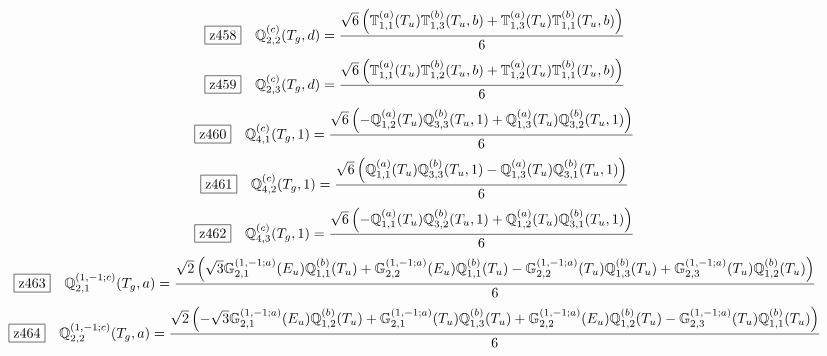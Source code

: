 \documentclass[fleqn,10pt,landscape]{jsarticle}
\begin{document}
\begin{dmath*}
\hspace*{3mm}\fbox{z458}\quad \mathbb{Q}_{2,2}^{(c)}(T_{g},d)=\frac{\sqrt{6} \left(\mathbb{T}_{1,1}^{(a)}(T_{u}) \mathbb{T}_{1,3}^{(b)}(T_{u},b) + \mathbb{T}_{1,3}^{(a)}(T_{u}) \mathbb{T}_{1,1}^{(b)}(T_{u},b)\right)}{6}
\end{dmath*}
\begin{dmath*}
\hspace*{3mm}\fbox{z459}\quad \mathbb{Q}_{2,3}^{(c)}(T_{g},d)=\frac{\sqrt{6} \left(\mathbb{T}_{1,1}^{(a)}(T_{u}) \mathbb{T}_{1,2}^{(b)}(T_{u},b) + \mathbb{T}_{1,2}^{(a)}(T_{u}) \mathbb{T}_{1,1}^{(b)}(T_{u},b)\right)}{6}
\end{dmath*}
\begin{dmath*}
\hspace*{3mm}\fbox{z460}\quad \mathbb{Q}_{4,1}^{(c)}(T_{g},1)=\frac{\sqrt{6} \left(- \mathbb{Q}_{1,2}^{(a)}(T_{u}) \mathbb{Q}_{3,3}^{(b)}(T_{u},1) + \mathbb{Q}_{1,3}^{(a)}(T_{u}) \mathbb{Q}_{3,2}^{(b)}(T_{u},1)\right)}{6}
\end{dmath*}
\begin{dmath*}
\hspace*{3mm}\fbox{z461}\quad \mathbb{Q}_{4,2}^{(c)}(T_{g},1)=\frac{\sqrt{6} \left(\mathbb{Q}_{1,1}^{(a)}(T_{u}) \mathbb{Q}_{3,3}^{(b)}(T_{u},1) - \mathbb{Q}_{1,3}^{(a)}(T_{u}) \mathbb{Q}_{3,1}^{(b)}(T_{u},1)\right)}{6}
\end{dmath*}
\begin{dmath*}
\hspace*{3mm}\fbox{z462}\quad \mathbb{Q}_{4,3}^{(c)}(T_{g},1)=\frac{\sqrt{6} \left(- \mathbb{Q}_{1,1}^{(a)}(T_{u}) \mathbb{Q}_{3,2}^{(b)}(T_{u},1) + \mathbb{Q}_{1,2}^{(a)}(T_{u}) \mathbb{Q}_{3,1}^{(b)}(T_{u},1)\right)}{6}
\end{dmath*}
\begin{dmath*}
\hspace*{3mm}\fbox{z463}\quad \mathbb{Q}_{2,1}^{(1,-1;c)}(T_{g},a)=\frac{\sqrt{2} \left(\sqrt{3} \mathbb{G}_{2,1}^{(1,-1;a)}(E_{u}) \mathbb{Q}_{1,1}^{(b)}(T_{u}) + \mathbb{G}_{2,2}^{(1,-1;a)}(E_{u}) \mathbb{Q}_{1,1}^{(b)}(T_{u}) - \mathbb{G}_{2,2}^{(1,-1;a)}(T_{u}) \mathbb{Q}_{1,3}^{(b)}(T_{u}) + \mathbb{G}_{2,3}^{(1,-1;a)}(T_{u}) \mathbb{Q}_{1,2}^{(b)}(T_{u})\right)}{6}
\end{dmath*}
\begin{dmath*}
\hspace*{3mm}\fbox{z464}\quad \mathbb{Q}_{2,2}^{(1,-1;c)}(T_{g},a)=\frac{\sqrt{2} \left(- \sqrt{3} \mathbb{G}_{2,1}^{(1,-1;a)}(E_{u}) \mathbb{Q}_{1,2}^{(b)}(T_{u}) + \mathbb{G}_{2,1}^{(1,-1;a)}(T_{u}) \mathbb{Q}_{1,3}^{(b)}(T_{u}) + \mathbb{G}_{2,2}^{(1,-1;a)}(E_{u}) \mathbb{Q}_{1,2}^{(b)}(T_{u}) - \mathbb{G}_{2,3}^{(1,-1;a)}(T_{u}) \mathbb{Q}_{1,1}^{(b)}(T_{u})\right)}{6}
\end{dmath*}
\end{document}
